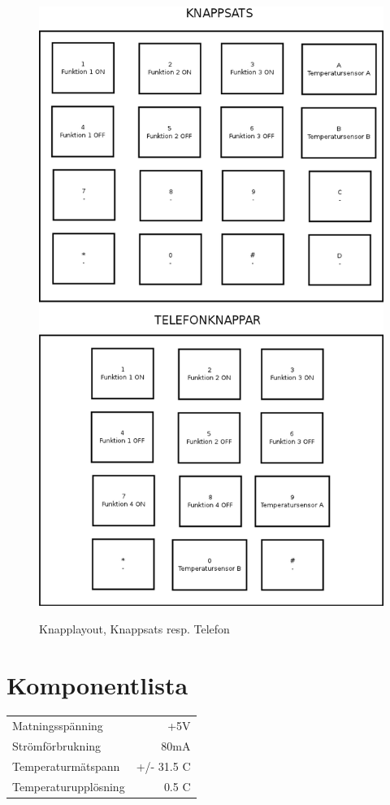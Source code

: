 \documentclass[a4paper,11pt]{article}
\begin{document}
		\begin{figure}[ht!]
		  \centering
		      \includegraphics[scale=0.48, angle=0]{UserInterface.png}
			\label{fig:UserInterface}
		  	\caption{Knapplayout, Knappsats resp. Telefon}
		\end{figure}

	\section{Komponentlista}

		\begin{tabular}{ l r}
		   	Matningsspänning & +5V\\
		   	Strömförbrukning & ~80mA\\
		   	Temperaturmätspann & +/- 31.5 C\\
			Temperaturupplösning & 0.5 C\\	
		\end{tabular}
\end{document}
